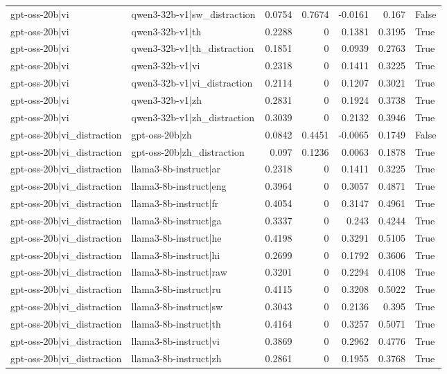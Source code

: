 \begin{table}
\begin{tabular}{l l r r r r l}
gpt-oss-20b|vi & qwen3-32b-v1|sw_distraction & 0.0754 & 0.7674 & -0.0161 & 0.167 & False \\
gpt-oss-20b|vi & qwen3-32b-v1|th & 0.2288 & 0 & 0.1381 & 0.3195 & True \\
gpt-oss-20b|vi & qwen3-32b-v1|th_distraction & 0.1851 & 0 & 0.0939 & 0.2763 & True \\
gpt-oss-20b|vi & qwen3-32b-v1|vi & 0.2318 & 0 & 0.1411 & 0.3225 & True \\
gpt-oss-20b|vi & qwen3-32b-v1|vi_distraction & 0.2114 & 0 & 0.1207 & 0.3021 & True \\
gpt-oss-20b|vi & qwen3-32b-v1|zh & 0.2831 & 0 & 0.1924 & 0.3738 & True \\
gpt-oss-20b|vi & qwen3-32b-v1|zh_distraction & 0.3039 & 0 & 0.2132 & 0.3946 & True \\
gpt-oss-20b|vi_distraction & gpt-oss-20b|zh & 0.0842 & 0.4451 & -0.0065 & 0.1749 & False \\
gpt-oss-20b|vi_distraction & gpt-oss-20b|zh_distraction & 0.097 & 0.1236 & 0.0063 & 0.1878 & True \\
gpt-oss-20b|vi_distraction & llama3-8b-instruct|ar & 0.2318 & 0 & 0.1411 & 0.3225 & True \\
gpt-oss-20b|vi_distraction & llama3-8b-instruct|eng & 0.3964 & 0 & 0.3057 & 0.4871 & True \\
gpt-oss-20b|vi_distraction & llama3-8b-instruct|fr & 0.4054 & 0 & 0.3147 & 0.4961 & True \\
gpt-oss-20b|vi_distraction & llama3-8b-instruct|ga & 0.3337 & 0 & 0.243 & 0.4244 & True \\
gpt-oss-20b|vi_distraction & llama3-8b-instruct|he & 0.4198 & 0 & 0.3291 & 0.5105 & True \\
gpt-oss-20b|vi_distraction & llama3-8b-instruct|hi & 0.2699 & 0 & 0.1792 & 0.3606 & True \\
gpt-oss-20b|vi_distraction & llama3-8b-instruct|raw & 0.3201 & 0 & 0.2294 & 0.4108 & True \\
gpt-oss-20b|vi_distraction & llama3-8b-instruct|ru & 0.4115 & 0 & 0.3208 & 0.5022 & True \\
gpt-oss-20b|vi_distraction & llama3-8b-instruct|sw & 0.3043 & 0 & 0.2136 & 0.395 & True \\
gpt-oss-20b|vi_distraction & llama3-8b-instruct|th & 0.4164 & 0 & 0.3257 & 0.5071 & True \\
gpt-oss-20b|vi_distraction & llama3-8b-instruct|vi & 0.3869 & 0 & 0.2962 & 0.4776 & True \\
gpt-oss-20b|vi_distraction & llama3-8b-instruct|zh & 0.2861 & 0 & 0.1955 & 0.3768 & True \\

\end{tabular}
\end{table}
